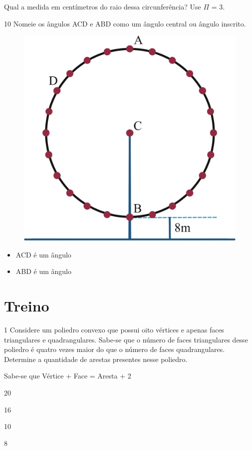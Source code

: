 Qual a medida em centímetros do raio dessa circunferência? Use $\Pi$ = 3. 


\pagebreak
\num{10} Nomeie os ângulos ACD e ABD como um ângulo central ou ângulo
inscrito.

\begin{figure}[htpb!]
\centering
\includegraphics[width=.5\textwidth]{./ilustras-mat/modulo_10_-atividade_10.png}
\end{figure}


\begin{itemize}
\item ACD é um ângulo 

\item ABD é um ângulo 
\end{itemize}

\section*{Treino}

\num{1} Considere um poliedro convexo que possui oito vértices e apenas faces
triangulares e quadrangulares. Sabe-se que o número de faces
triangulares desse poliedro é quatro vezes maior do que o número de
faces quadrangulares. Determine a quantidade de arestas presentes nesse
poliedro.

Sabe-se que Vértice + Face = Aresta + 2

\begin{escolha}
  \item 20

  \item 16

  \item 10

  \item 8
\end{escolha}

